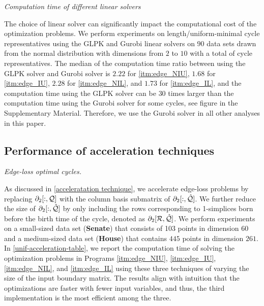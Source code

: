\emph{Computation time of different linear solvers}

The choice of linear solver can significantly impact the computational cost of the optimization problems. We perform experiments on length/uniform-minimal cycle representatives using the GLPK \cite{glpk} and Gurobi \cite{gurobi} linear solvers on $90$ data sets drawn from the normal distribution with dimensions from $2$ to $10$ with a total of \DIFdelbegin {}\DIFdelend \DIFaddbegin {}\DIFaddend cycle representatives. The median of the computation time ratio between using the GLPK solver and Gurobi solver is $2.22$ for \pr
\ref{itm:edge_NIU}, $1.68$ for \pr \ref{itm:edge_IU}, $2.28$ for \pr \ref{itm:edge_NIL}, and $1.73$ for \pr \ref{itm:edge_IL}, and the computation time using the GLPK solver can be $30$ times larger than the computation time using the Gurobi solver for some cycles, see figure in the Supplementary Material. Therefore, we use the Gurobi solver in all other analyses in this paper. 



 

\subsection{Performance of acceleration techniques} \label{accelerateresults}

\emph{Edge-loss optimal cycles.} 

As discussed in \se \ref{acceleratation technique}, we accelerate edge-loss problems by replacing $\partial_2[:, \mathcal Q]$ with the column basis submatrix of $\partial_2[:, \hat {\mathcal Q}]$. We further reduce the size of $\partial_2[:, \hat {\mathcal Q}]$ by only including the rows corresponding to 1-simplices born before the birth time of the cycle, denoted as $\partial_2[\mathcal R, \hat {\mathcal Q}]$. We perform experiments on a small-sized data set (\textbf{Senate}) that consists of 103 points in dimension $60$ and a medium-sized data set (\textbf{House}) that contains $445$ points in dimension $261$. In \tab
\ref{unif-acceleration-table}, we report the computation time of solving the optimization problems in Programs \ref{itm:edge_NIU}, \ref{itm:edge_IU}, \ref{itm:edge_NIL}, and \ref{itm:edge_IL} using these three techniques of varying the size of the input boundary matrix. The results align with intuition that the optimizations are faster with fewer input variables, and thus, the third implementation is the most efficient among the three.

